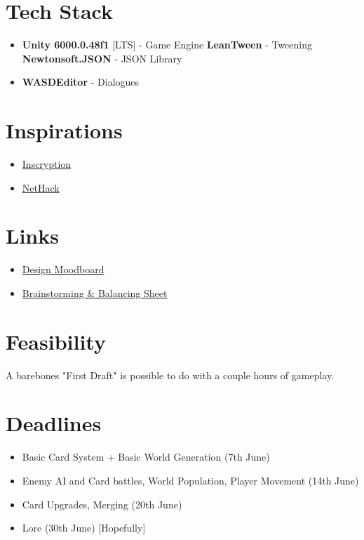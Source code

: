 \documentclass[10pt, a4paper]{article}
\begin{document}
	\section{Tech Stack}
		\begin{itemize}
			\item \textbf{Unity 6000.0.48f1} [LTS] - Game Engine
			\subitem \textbf{LeanTween} - Tweening
			\subitem \textbf{Newtonsoft.JSON} - JSON Library
			\item \textbf{WASDEditor} - Dialogues
		\end{itemize}
	\section{Inspirations}
	\begin{itemize}
		\item \href{https://www.inscryption.com}{Inscryption}
		\item \href{https://www.nethack.org}{NetHack}
	\end{itemize}
	
	\section{Links}
	\begin{itemize}
		\item \href{https://www.figma.com/design/Zb3b7Vf4XvZ4UPItO0jaNE/Deck-Builder}{Design Moodboard}
		\item \href{https://docs.google.com/spreadsheets/d/16LLjNDr2vdsV7ZZCh_UFrKlwE__lp5mAs24b4kD_r_s/edit?usp=sharing}{Brainstorming \& Balancing Sheet}
	\end{itemize}
	\section{Feasibility}
	A barebones "First Draft" is possible to do with a couple hours of gameplay.
	
	\section{Deadlines}
	\begin{itemize}
	\item Basic Card System + Basic World Generation (7th June)
	\item Enemy AI and Card battles, World Population, Player Movement (14th June)
	\item Card Upgrades, Merging (20th June)
	\item Lore (30th June) [Hopefully]
	\end{itemize}
\end{document}
